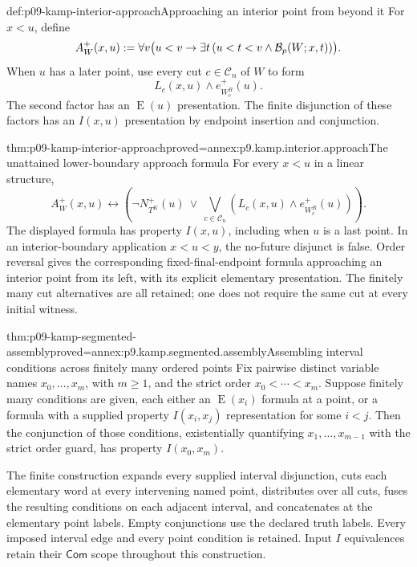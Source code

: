 \begin{hbdefinition}{def:p09-kamp-interior-approach}{Approaching an interior point from beyond it}
For \(x<u\), define
\[
 A_W^+(x,u)\mathrel{:=}\forall v\bigl(u<v\to
       \exists t\,(u<t<v\land\mathcal B_p(W;x,t))\bigr).
\]
When \(u\) has a later point, use every cut \(c\in\mathcal C_n\)
of \(W\) to form
\[
                    L_c(x,u)\land e_{W_c^R}^+(u).
\]
The second factor has an \(\operatorname{E}(u)\) presentation.
The finite disjunction of these factors has an \(I(x,u)\)
presentation by endpoint insertion and conjunction.
\end{hbdefinition}

\begin{hblemma}{thm:p09-kamp-interior-approach}{proved=annex:p9.kamp.interior.approach}{The unattained lower-boundary approach formula}
For every \(x<u\) in a linear structure,
\[
 A_W^+(x,u)\longleftrightarrow
 \left(\neg N_{T^K}^+(u)\ \lor\
   \bigvee_{c\in\mathcal C_n}
          (L_c(x,u)\land e_{W_c^R}^+(u))\right).
\]
The displayed formula has property \(I(x,u)\), including when
\(u\) is a last point. In an interior-boundary application
\(x<u<y\), the no-future disjunct is false.
Order reversal gives the corresponding fixed-final-endpoint formula
approaching an interior point from its left, with its explicit
elementary presentation. The finitely many cut alternatives are all
retained; one does not require the same cut at every initial witness.
\end{hblemma}

\begin{hblemma}{thm:p09-kamp-segmented-assembly}{proved=annex:p9.kamp.segmented.assembly}{Assembling interval conditions across finitely many ordered points}
Fix pairwise distinct variable names \(x_0,\ldots,x_m\), with \(m\geq1\),
and the strict order \(x_0<\cdots<x_m\).
Suppose finitely many conditions are given, each either an
\(\operatorname{E}(x_i)\) formula at a point, or a formula
with a supplied property \(I(x_i,x_j)\) representation for
some \(i<j\). Then the conjunction of those conditions,
existentially quantifying \(x_1,\ldots,x_{m-1}\) with the
strict order guard, has property \(I(x_0,x_m)\).

The finite construction expands every supplied interval disjunction,
cuts each elementary word at every intervening named point, distributes
over all cuts, fuses the resulting conditions on each adjacent interval,
and concatenates at the elementary point labels. Empty conjunctions use
the declared truth labels. Every imposed interval edge and every point
condition is retained. Input \(I\) equivalences retain their
\(\mathsf{Com}\) scope throughout this construction.
\end{hblemma}

